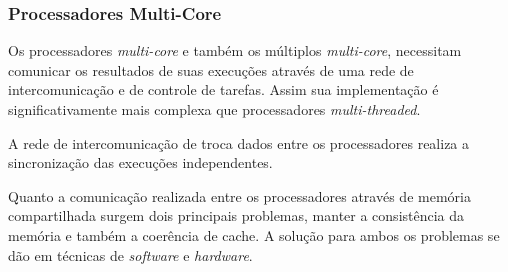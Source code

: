 \subsubsection{Processadores Multi-Core}

Os processadores \textit{multi-core} e também os múltiplos
\textit{multi-core}, necessitam comunicar os resultados de suas execuções
através de uma rede de intercomunicação e de controle de tarefas.
Assim sua implementação é significativamente mais complexa que processadores
\textit{multi-threaded}.

A rede de intercomunicação de troca dados entre os processadores realiza a
sincronização das execuções independentes.

Quanto a comunicação realizada entre os processadores através de memória
compartilhada surgem dois principais problemas, manter a consistência da memória
e também a coerência de cache.
A solução para ambos os problemas se dão em técnicas de \textit{software} e
\textit{hardware}.
